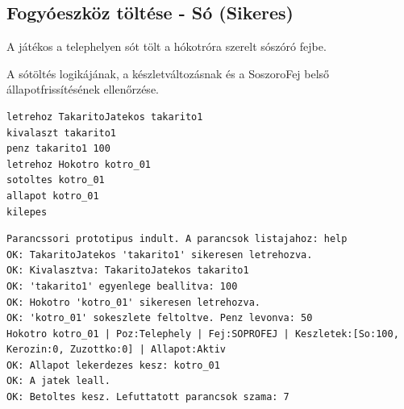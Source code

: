 \subsection{Fogyóeszköz töltése - Só (Sikeres)}
\begin{test-case-description}
    A játékos a telephelyen sót tölt a hókotróra szerelt sószóró fejbe.
\end{test-case-description}
\begin{test-case-function}
    A sótöltés logikájának, a készletváltozásnak és a SoszoroFej belső állapotfrissítésének ellenőrzése.
\end{test-case-function}
\begin{test-case-input}
\begin{verbatim}
letrehoz TakaritoJatekos takarito1
kivalaszt takarito1
penz takarito1 100
letrehoz Hokotro kotro_01
sotoltes kotro_01
allapot kotro_01
kilepes
\end{verbatim}
\end{test-case-input}
\begin{test-case-output}
\begin{verbatim}
Parancssori prototipus indult. A parancsok listajahoz: help
OK: TakaritoJatekos 'takarito1' sikeresen letrehozva.
OK: Kivalasztva: TakaritoJatekos takarito1
OK: 'takarito1' egyenlege beallitva: 100
OK: Hokotro 'kotro_01' sikeresen letrehozva.
OK: 'kotro_01' sokeszlete feltoltve. Penz levonva: 50
Hokotro kotro_01 | Poz:Telephely | Fej:SOPROFEJ | Keszletek:[So:100, Kerozin:0, Zuzottko:0] | Allapot:Aktiv
OK: Allapot lekerdezes kesz: kotro_01
OK: A jatek leall.
OK: Betoltes kesz. Lefuttatott parancsok szama: 7
\end{verbatim}
\end{test-case-output}

